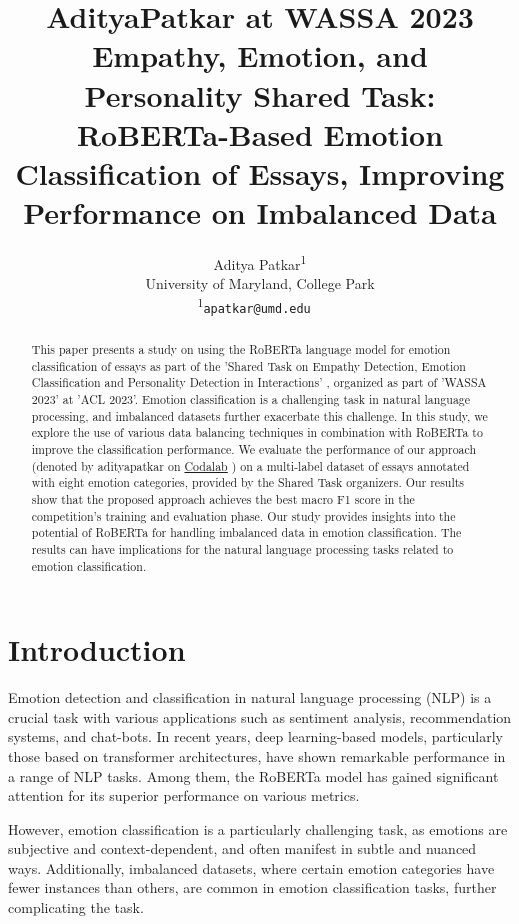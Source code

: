 \documentclass[11pt]{article}
\title{AdityaPatkar at WASSA 2023 Empathy, Emotion, and Personality Shared Task: RoBERTa-Based Emotion Classification of Essays, Improving Performance on Imbalanced Data}
\author{Aditya Patkar\textsuperscript{1} \\
       University of Maryland, College Park \\
       \textsuperscript{1}\texttt{apatkar@umd.edu} \ }
\begin{document}
\maketitle
\begin{abstract}
This paper presents a study on using the RoBERTa language model for emotion classification of essays as part of the 'Shared Task on Empathy Detection, Emotion Classification and Personality Detection in Interactions' \citep{barriere2023wassa}, organized as part of 'WASSA 2023' at 'ACL 2023'. Emotion classification is a challenging task in natural language processing, and imbalanced datasets further exacerbate this challenge. In this study, we explore the use of various data balancing techniques in combination with RoBERTa \citep{liu2019roberta} to improve the classification performance. We evaluate the performance of our approach (denoted by adityapatkar on \href{https://codalab.lisn.upsaclay.fr/competitions/11167#results}{Codalab} \citep{codalab_competitions}) on a multi-label dataset of essays annotated with eight emotion categories, provided by the Shared Task organizers. Our results show that the proposed approach achieves the best macro F1 score in the competition's training and evaluation phase. Our study provides insights into the potential of RoBERTa for handling imbalanced data in emotion classification. The results can have implications for the natural language processing tasks related to emotion classification.
\end{abstract}


\section{Introduction}

Emotion detection and classification in natural language processing (NLP) is a crucial task with various applications such as sentiment analysis, recommendation systems, and chat-bots. In recent years, deep learning-based models, particularly those based on transformer architectures, have shown remarkable performance in a range of NLP tasks. Among them, the RoBERTa model has gained significant attention for its superior performance on various metrics.

However, emotion classification is a particularly challenging task, as emotions are subjective and context-dependent, and often manifest in subtle and nuanced ways. Additionally, imbalanced datasets, where certain emotion categories have fewer instances than others, are common in emotion classification tasks, further complicating the task.
\end{document}
